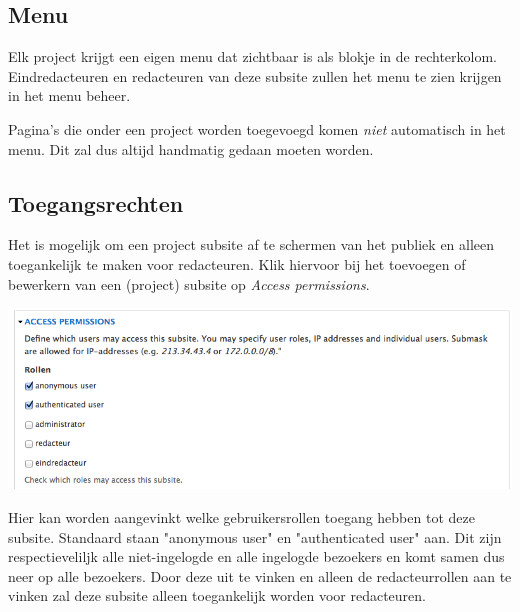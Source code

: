 \subsection{Menu}

Elk project krijgt een eigen menu dat zichtbaar is als blokje in de rechterkolom. Eindredacteuren en redacteuren van deze subsite zullen het menu te zien krijgen in het menu beheer.

Pagina's die onder een project worden toegevoegd komen \emph{niet} automatisch in het menu. Dit zal dus altijd handmatig gedaan moeten worden.

\subsection{Toegangsrechten}

Het is mogelijk om een project subsite af te schermen van het publiek en alleen toegankelijk te maken voor redacteuren. Klik hiervoor bij het toevoegen of bewerkern van een (project) subsite op \emph{Access permissions}.

\begin{center}
\includegraphics[width=\textwidth]{img/dominionaccess.png}
\end{center}

Hier kan worden aangevinkt welke gebruikersrollen toegang hebben tot deze subsite. Standaard staan "anonymous user" en "authenticated user" aan. Dit zijn respectieveliljk alle niet-ingelogde en alle ingelogde bezoekers en komt samen dus neer op alle bezoekers. Door deze uit te vinken en alleen de redacteurrollen aan te vinken zal deze subsite alleen toegankelijk worden voor redacteuren.




